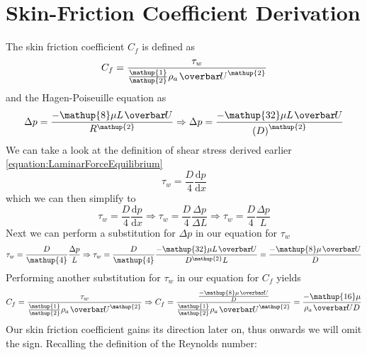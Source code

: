 












\section{Skin-Friction Coefficient Derivation }
\label{appendix:b}
The skin friction coefficient \( C_f \) is defined as
\begin{equation}
    C_f = \frac{\tau_w}{\frac{\mathup{1}}{\mathup{2}}\rho_a \avg{U}^\mathup{2}}
\end{equation}
and the Hagen-Poiseuille equation as
\begin{equation}
    \Delta p = \frac{-\mathup{8} \mu L \avg{U}}{R^\mathup{2}} \Rightarrow \Delta p = \frac{-\mathup{32} \mu L \avg{U}}{\left(D\right)^\mathup{2}}
\end{equation}
We can take a look at the definition of shear stress derived earlier \eqref{equation:LaminarForceEquilibrium}
\begin{equation}
    \tau_w = \frac{D}{\mathup{4}}\frac{\mathrm{d}p}{\mathrm{d}x}
\end{equation}
which we can then simplify to
\begin{equation}
    \tau_w = \frac{D}{\mathup{4}} \frac{\mathrm{d}p}{\mathrm{d}x} \Rightarrow \tau_w = \frac{D}{\mathup{4}} \frac{\Delta p}{\Delta L} \Rightarrow \tau_w = \frac{D}{\mathup{4}}\frac{\Delta p}{L}
\end{equation}
Next we can perform a substitution for \( \Delta p \) in our equation for \( \tau_w \)
\begin{equation}
    \tau_w = \frac{D}{\mathup{4}}\frac{\Delta p}{L} \Rightarrow \tau_w = \frac{D}{\mathup{4}}\frac{-\mathup{32} \mu L \avg{U}}{D^\mathup{2} L} = \frac{-\mathup{8} \mu \avg{U}}{D}
\end{equation}
Performing another substitution for \( \tau_w \) in our equation for \( C_f \) yields
\begin{equation}
    C_f = \frac{\tau_w}{\frac{\mathup{1}}{\mathup{2}}\rho_a \avg{U}^\mathup{2}} \Rightarrow C_f = \frac{\frac{-\mathup{8}\mu \avg{U}}{D}}{\frac{\mathup{1}}{\mathup{2}}\rho_a \avg{U}^\mathup{2}} = \frac{-\mathup{16}\mu}{\rho_a \avg{U}D}
\end{equation}
Our skin friction coefficient gains its direction later on, thus onwards we will omit the sign. Recalling the definition of the Reynolds number:

